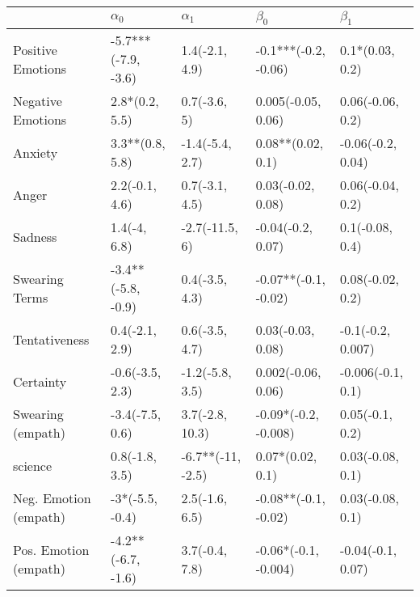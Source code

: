 \begin{tabular}{lllll}
\toprule
{} &           $\alpha_0$ &         $\alpha_1$ &             $\beta_0$ &          $\beta_1$ \\
\midrule
Positive Emotions     &  -5.7***(-7.9, -3.6) &     1.4(-2.1, 4.9) &  -0.1***(-0.2, -0.06) &    0.1*(0.03, 0.2) \\
Negative Emotions     &       2.8*(0.2, 5.5) &       0.7(-3.6, 5) &    0.005(-0.05, 0.06) &   0.06(-0.06, 0.2) \\
Anxiety               &      3.3**(0.8, 5.8) &    -1.4(-5.4, 2.7) &     0.08**(0.02, 0.1) &  -0.06(-0.2, 0.04) \\
Anger                 &       2.2(-0.1, 4.6) &     0.7(-3.1, 4.5) &     0.03(-0.02, 0.08) &   0.06(-0.04, 0.2) \\
Sadness               &         1.4(-4, 6.8) &     -2.7(-11.5, 6) &     -0.04(-0.2, 0.07) &    0.1(-0.08, 0.4) \\
Swearing Terms        &   -3.4**(-5.8, -0.9) &     0.4(-3.5, 4.3) &  -0.07**(-0.1, -0.02) &   0.08(-0.02, 0.2) \\
Tentativeness         &       0.4(-2.1, 2.9) &     0.6(-3.5, 4.7) &     0.03(-0.03, 0.08) &  -0.1(-0.2, 0.007) \\
Certainty             &      -0.6(-3.5, 2.3) &    -1.2(-5.8, 3.5) &    0.002(-0.06, 0.06) &  -0.006(-0.1, 0.1) \\
Swearing (empath)     &      -3.4(-7.5, 0.6) &    3.7(-2.8, 10.3) &  -0.09*(-0.2, -0.008) &    0.05(-0.1, 0.2) \\
science               &       0.8(-1.8, 3.5) &  -6.7**(-11, -2.5) &      0.07*(0.02, 0.1) &   0.03(-0.08, 0.1) \\
Neg. Emotion (empath) &      -3*(-5.5, -0.4) &     2.5(-1.6, 6.5) &  -0.08**(-0.1, -0.02) &   0.03(-0.08, 0.1) \\
Pos. Emotion (empath) &   -4.2**(-6.7, -1.6) &     3.7(-0.4, 7.8) &  -0.06*(-0.1, -0.004) &  -0.04(-0.1, 0.07) \\
\bottomrule
\end{tabular}
